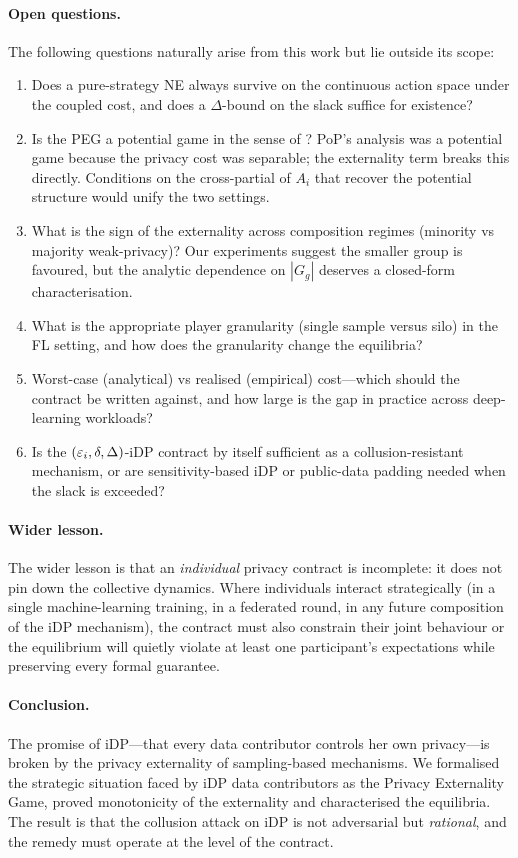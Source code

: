 \paragraph{Open questions.} The following questions naturally arise from
this work but lie outside its scope:
\begin{enumerate}
\item Does a pure-strategy NE always survive on the continuous action space
under the coupled cost, and does a $\Delta$-bound on the slack suffice for
existence?
\item Is the PEG a potential game in the sense of \cite{monderer1996potential}?
PoP's analysis was a potential game because the privacy cost was
separable; the externality term breaks this directly. Conditions on the
cross-partial of $A_i$ that recover the potential structure would unify
the two settings.
\item What is the sign of the externality across composition regimes
(minority vs majority weak-privacy)? Our experiments suggest the smaller
group is favoured, but the analytic dependence on $|G_g|$ deserves a
closed-form characterisation.
\item What is the appropriate player granularity (single sample versus
silo) in the FL setting, and how does the granularity change the
equilibria?
\item Worst-case (analytical) vs realised (empirical) cost---which should
the contract be written against, and how large is the gap in practice
across deep-learning workloads?
\item Is the $(\varepsilon_i, \delta, \Delta)$-iDP contract by itself sufficient
as a collusion-resistant mechanism, or are sensitivity-based iDP or
public-data padding needed when the slack is exceeded?
\end{enumerate}

\paragraph{Wider lesson.} The wider lesson is that an \emph{individual}
privacy contract is incomplete: it does not pin down the collective
dynamics. Where individuals interact strategically (in a single
machine-learning training, in a federated round, in any future composition
of the iDP mechanism), the contract must also constrain their joint
behaviour or the equilibrium will quietly violate at least one
participant's expectations while preserving every formal guarantee.

\paragraph{Conclusion.} The promise of iDP---that every data contributor
controls her own privacy---is broken by the privacy externality of
sampling-based mechanisms. We formalised the strategic situation faced by
iDP data contributors as the Privacy Externality Game, proved monotonicity
of the externality and characterised the equilibria. The result is that
the collusion attack on iDP is not adversarial but \emph{rational}, and the
remedy must operate at the level of the contract.
